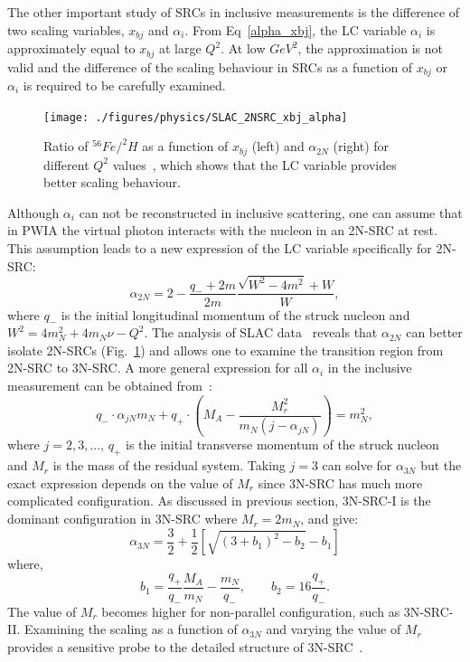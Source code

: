 The other important study of SRCs in inclusive measurements is the difference of two scaling variables, $x_{bj}$ and $\alpha_{i}$. From Eq~\eqref{alpha_xbj}, the LC variable $\alpha_{i}$ is approximately equal to $x_{bj}$ at large $Q^{2}$. At low $GeV^{2}$, the approximation is not valid and the difference of the scaling behaviour in SRCs as a function of $x_{bj}$ or $\alpha_{i}$ is required to be carefully examined. 
\begin{figure}[!ht]
  \begin{center}
    \texttt{[image: ./figures/physics/SLAC\_2NSRC\_xbj\_alpha]}
    \caption[Ratio of $^{56}Fe/^{2}H$ as a function of $x_{bj}$ and $\alpha_{2N}$]{\footnotesize{Ratio of $^{56}Fe/^{2}H$ as a function of $x_{bj}$ (left) and $\alpha_{2N}$ (right) for different $Q^{2}$ values~\cite{SLAC_Measurement_PRC.48.2451}, which shows that the LC variable provides better scaling behaviour.}}
    \label{SLAC_2NSRC_xbj_alpha}
  \end{center}
\end{figure} 
Although $\alpha_{i}$ can not be reconstructed in inclusive scattering, one can assume that in PWIA the virtual photon interacts with the nucleon in an 2N-SRC at rest. This assumption leads to a new expression of the LC variable specifically for 2N-SRC:
\begin{equation}
  \alpha_{2N} = 2-\frac{q_{-}+2m}{2m}\frac{\sqrt{W^{2}-4m^{2}}+W}{W},  
\end{equation}
where $q_{-}$ is the initial longitudinal momentum of the struck nucleon and $W^{2}=4m_{N}^{2}+4m_{N}\nu-Q^{2}$. The analysis of SLAC data~\cite{SLAC_Measurement_PRC.48.2451} reveals that $\alpha_{2N}$ can better isolate 2N-SRCs (Fig.~\ref{SLAC_2NSRC_xbj_alpha}) and allows one to examine the transition region from 2N-SRC to 3N-SRC. A more general expression for all $\alpha_{i}$ in the inclusive measurement can be obtained from~\cite{e08014_pr}:
\begin{equation}
  q_{-}\cdot\alpha_{jN}m_{N}+q_{+}\cdot\left(M_{A}-\frac{M_{r}^{2}}{m_{N}(j-\alpha_{jN})}\right)=m_{N}^{2},
\end{equation}
where $j=2,3,...$, $q_{+}$ is the initial transverse momentum of the struck nucleon and $M_{r}$ is the mass of the residual system. Taking $j=3$ can solve for $\alpha_{3N}$ but the exact expression depends on the value of $M_{r}$ since 3N-SRC has much more complicated configuration. As discussed in previous section, 3N-SRC-I is the dominant configuration in 3N-SRC where $M_{r}=2m_{N}$, and give:
\begin{equation}
  \alpha_{3N} = \frac{3}{2}+\frac{1}{2}[\sqrt{ (3+b_{1})^{2}-b_{2}}-b_{1}]
\end{equation} 
where,
\begin{equation}
  b_{1} = \frac{q_{+}}{q_{-}} \frac{M_{A}}{m_{N}}-\frac{m_{N}}{q_{-}},\qquad b_{2} = 16 \frac{q_{+}}{q_{-}}.
\end{equation} 
The value of $M_{r}$ becomes higher for non-parallel configuration, such as 3N-SRC-II. Examining the scaling as a function of $\alpha_{3N}$ and varying the value of $M_{r}$ provides a sensitive probe to the detailed structure of 3N-SRC~\cite{e08014_pr}.

